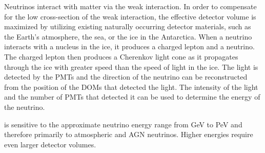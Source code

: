 Neutrinos interact with matter via the weak interaction.
In order to compensate for the low cross-section of the weak interaction,
  the effective detector volume is maximized by utilizing existing naturally occurring detector materials,
  such as
    the Earth's atmosphere,
    the sea,
    or the ice in the Antarctica.
%
When a neutrino interacts with a nucleus in the ice,
it produces a charged lepton and a neutrino.
The charged lepton then produces a Cherenkov light cone
as it propagates through the ice
with greater speed than the speed of light in the ice.
The light is detected by the \acp{PMT}
  and the direction of the neutrino can be reconstructed
    from the position of the \acp{DOM}
      that detected the light.
The intensity of the light and the number of \acp{PMT} that detected it
  can be used to determine the energy of the neutrino.

\icecube{}
is sensitive to
  the approximate neutrino energy range
    from \si{\giga\electronvolt} to \si{\peta\electronvolt} \cite{icecube_aartsen}
  and therefore primarily to atmospheric and \ac{AGN} neutrinos.
Higher energies require even larger detector volumes.


